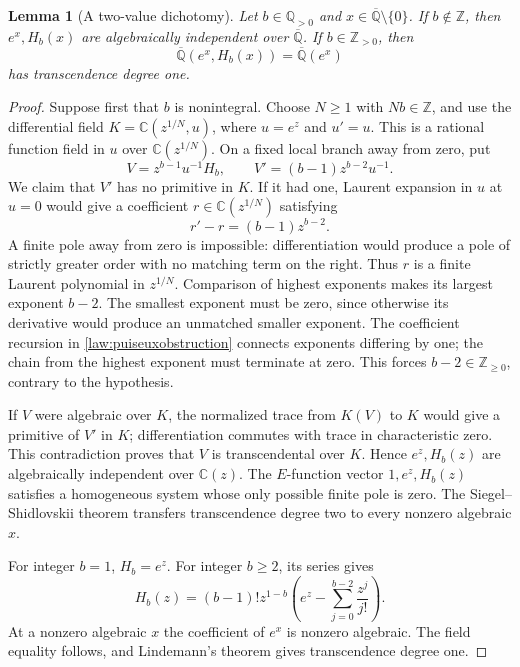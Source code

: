 \documentclass[11pt,a4paper]{article}
\newcommand{\Q}{\mathbb Q}
\newcommand{\C}{\mathbb C}
\newcommand{\Qbar}{\overline{\mathbb Q}}
\newtheorem{lemma}[theorem]{Lemma}
\theoremstyle{definition}
\theoremstyle{remark}
\numberwithin{equation}{section}
\begin{document}
\begin{lemma}[A two-value dichotomy]\label{law:twoind}
Let $b\in\Q_{>0}$ and $x\in\Qbar\setminus\{0\}$.
If $b\notin\mathbb Z$, then $e^x,H_b(x)$ are algebraically independent
over $\Qbar$. If $b\in\mathbb Z_{>0}$, then
\[
 \Qbar(e^x,H_b(x))=\Qbar(e^x)
\]
has transcendence degree one.
\end{lemma}
\begin{proof}
Suppose first that $b$ is nonintegral. Choose $N\geq1$ with
$Nb\in\mathbb Z$, and use the differential field
$K=\C(z^{1/N},u)$, where $u=e^z$ and $u'=u$.
This is a rational function field in $u$ over $\C(z^{1/N})$.
On a fixed local branch away from zero, put
\[
 V=z^{b-1}u^{-1}H_b,
 \qquad V'=(b-1)z^{b-2}u^{-1}.
\]
We claim that $V'$ has no primitive in $K$. If it had one, Laurent
expansion in $u$ at $u=0$ would give a coefficient
$r\in\C(z^{1/N})$ satisfying
\begin{equation}\label{law:puiseuxobstruction}
 r'-r=(b-1)z^{b-2}.
\end{equation}
A finite pole away from zero is impossible: differentiation would
produce a pole of strictly greater order with no matching term on
the right. Thus $r$ is a finite Laurent polynomial in $z^{1/N}$.
Comparison of highest exponents makes its largest exponent $b-2$.
The smallest exponent must be zero, since otherwise its derivative
would produce an unmatched smaller exponent. The coefficient recursion
in \eqref{law:puiseuxobstruction} connects exponents differing by one;
the chain from the highest exponent must terminate at zero. This
forces $b-2\in\mathbb Z_{\geq0}$, contrary to the hypothesis.

If $V$ were algebraic over $K$, the normalized trace from $K(V)$
to $K$ would give a primitive of $V'$ in $K$; differentiation commutes
with trace in characteristic zero. This contradiction proves that
$V$ is transcendental over $K$. Hence $e^z,H_b(z)$ are algebraically
independent over $\C(z)$. The $E$-function vector $1,e^z,H_b(z)$
satisfies a homogeneous system whose only possible finite pole is
zero. The Siegel--Shidlovskii theorem transfers transcendence degree
two to every nonzero algebraic $x$.

For integer $b=1$, $H_b=e^z$. For integer $b\geq2$, its series gives
\begin{equation}\label{law:integerH}
 H_b(z)=(b-1)!z^{1-b}
 \left(e^z-\sum_{j=0}^{b-2}\frac{z^j}{j!}\right).
\end{equation}
At a nonzero algebraic $x$ the coefficient of $e^x$ is nonzero
algebraic. The field equality follows, and Lindemann's theorem gives
transcendence degree one.
\end{proof}
\end{document}

